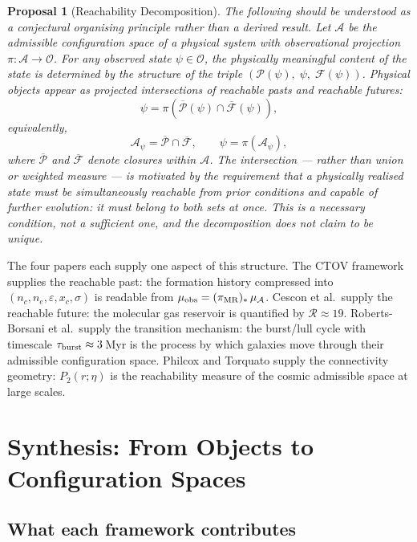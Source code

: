 \documentclass[12pt, oneside]{article}
\newtheorem{proposal}{Proposal}
\begin{document}
\begin{proposal}[Reachability Decomposition]
The following should be understood as a conjectural organising principle rather than a derived result. Let $\mathcal{A}$ be the admissible configuration space of a physical system with observational projection $\pi : \mathcal{A} \to \mathcal{O}$. For any observed state $\psi \in \mathcal{O}$, the physically meaningful content of the state is determined by the structure of the triple $(\mathcal{P}(\psi),\; \psi,\; \mathcal{F}(\psi))$. Physical objects appear as projected intersections of reachable pasts and reachable futures:
\[
\psi = \pi\!\left(\overline{\mathcal{P}}(\psi) \cap \overline{\mathcal{F}}(\psi)\right),
\]
equivalently,
\[
\mathcal{A}_\psi = \overline{\mathcal{P}} \cap \overline{\mathcal{F}}, \qquad \psi = \pi(\mathcal{A}_\psi),
\]
where $\overline{\mathcal{P}}$ and $\overline{\mathcal{F}}$ denote closures within $\mathcal{A}$. The intersection --- rather than union or weighted measure --- is motivated by the requirement that a physically realised state must be simultaneously reachable from prior conditions and capable of further evolution: it must belong to both sets at once. This is a necessary condition, not a sufficient one, and the decomposition does not claim to be unique.
\end{proposal}

The four papers each supply one aspect of this structure. The CTOV framework supplies the reachable past: the formation history compressed into $(n_c, n_e, \varepsilon, x_c, \sigma)$ is readable from $\mu_{\rm obs} = (\pi_{\rm MR})_*\,\mu_{\mathcal{A}}$. Cescon et al.\ supply the reachable future: the molecular gas reservoir is quantified by $\mathcal{R} \approx 19$. Roberts-Borsani et al.\ supply the transition mechanism: the burst/lull cycle with timescale $\tau_{\rm burst} \approx 3$\,Myr is the process by which galaxies move through their admissible configuration space. Philcox and Torquato supply the connectivity geometry: $P_2(r;\eta)$ is the reachability measure of the cosmic admissible space at large scales.

\section{Synthesis: From Objects to Configuration Spaces}

\subsection{What each framework contributes}
\end{document}
